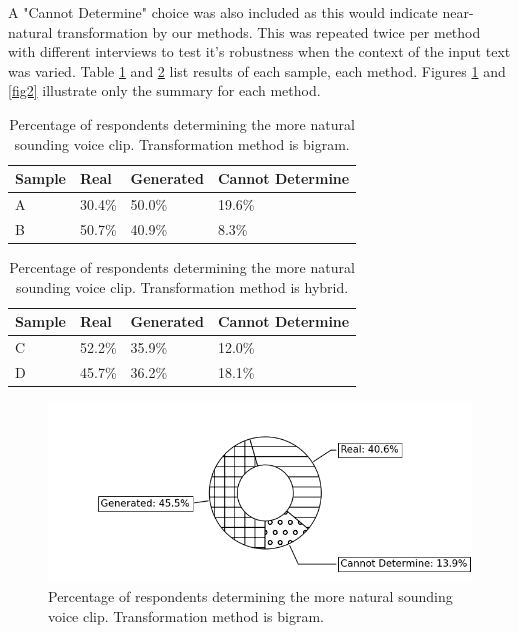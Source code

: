 \documentclass[journal]{IEEEtran}
\begin{document}
A "Cannot Determine" choice was also included as this would indicate near-natural transformation by our methods. This was repeated twice per method with different interviews to test it's robustness when the context of the input text was varied. Table \ref{tab2} and \ref{tab3} list results of each sample, each method. Figures \ref{fig1} and \ref{fig2} illustrate only the summary for each method.

\begin{table}
\caption{Percentage of respondents determining the more natural sounding voice clip. Transformation method is bigram.}
\label{tab2}
\small
\setlength{\tabcolsep}{3pt}
\begin{tabular}{|p{58pt}|p{58pt}|p{58pt}|p{58pt}|}
\hline
Sample& 
Real& 
Generated&
Cannot Determine \\
\hline
A & 30.4\% & 50.0\% & 19.6\% \\
B & 50.7\% & 40.9\% & 8.3\% \\ 
\hline
\end{tabular}
\label{tab2}
\end{table}

\begin{table}
\caption{Percentage of respondents determining the more natural sounding voice clip. Transformation method is hybrid.}
\label{tab3}
\small
\setlength{\tabcolsep}{3pt}
\begin{tabular}{|p{58pt}|p{58pt}|p{58pt}|p{58pt}|}
\hline
Sample& 
Real& 
Generated&
Cannot Determine \\
\hline
C & 52.2\% & 35.9\% & 12.0\% \\
D & 45.7\% & 36.2\% & 18.1\% \\ 
\hline
\end{tabular}
\label{tab3}
\end{table}

\begin{figure}
\centerline{\includegraphics[width=\columnwidth]{bigram.png}}
\caption{Percentage of respondents determining the more natural sounding voice clip. Transformation method is bigram.}
\label{fig1}
\end{figure}
\end{document}
